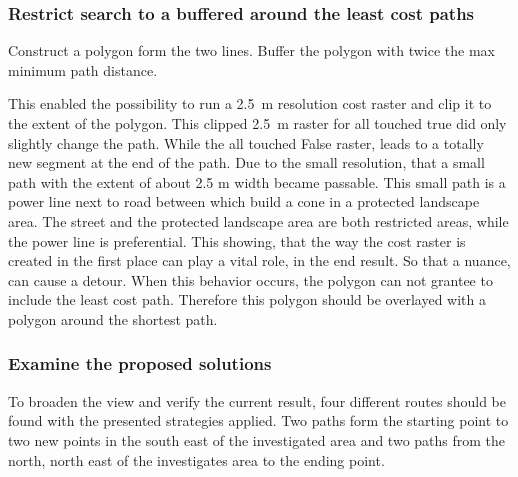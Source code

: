 \subsubsection{Restrict search to a buffered around the least cost paths}

Construct a polygon form the two lines.
Buffer the polygon with twice the max minimum path distance.


This enabled the possibility  to run a 2.5~m resolution cost raster and clip it to the extent of the polygon. 
This clipped 2.5~m raster for all touched true did only slightly change the path. 
While the all touched False raster, leads to a totally new segment at the end of the path. 
Due to the small resolution, that a small path with the extent of about 2.5 m width became passable.
This small path is a power line next to road between which build a cone in a protected landscape area.
The street and the protected landscape area are both restricted areas, while the power line is preferential.
This showing, that the way the cost raster is created in the first place can play a vital role, in the end result.
So that a nuance, can cause a detour.
When this behavior occurs, the polygon can not grantee to include the least cost path.
Therefore this polygon should be overlayed with a polygon around the shortest path.



\subsubsection{Examine the proposed solutions}
To broaden the view and verify the current result, four different routes should be found with the presented strategies applied.
Two paths form the starting point to two new points in the south east of the investigated area and two paths from the north, north east of the investigates area to the ending point.


